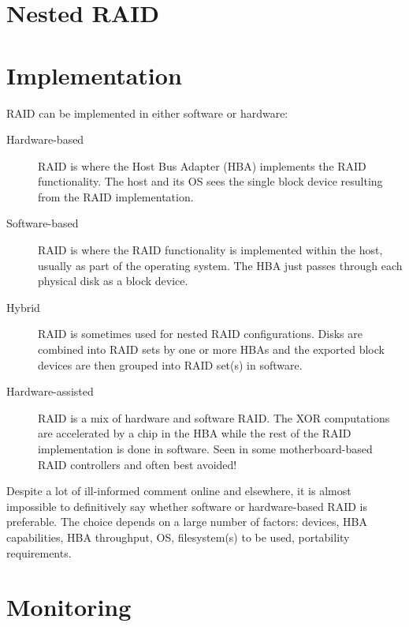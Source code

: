 \documentclass[slides]{pgnotes}
\begin{document}
\section{Nested RAID}
\label{sec:nested-raid}

\begin{minipage}{0.4\linewidth}
\end{minipage}
\hfill
\begin{minipage}{0.4\linewidth}
\end{minipage}

\section{Implementation}
\label{sec:implementation}

RAID can be implemented in either software or hardware:

\begin{description}
\item[Hardware-based]
RAID is where the Host Bus Adapter (HBA) implements the RAID
functionality. The host and its OS sees the single block device
resulting from the RAID implementation.
\item[Software-based]
RAID is where the RAID functionality is implemented within the host,
usually as part of the operating system. The HBA just passes through
each physical disk as a block device.
\item[Hybrid]
RAID is sometimes used for nested RAID configurations. Disks are
combined into RAID sets by one or more HBAs and the exported block
devices are then grouped into RAID set(s) in software.
\item[Hardware-assisted]
RAID is a mix of hardware and software RAID. The XOR computations are
accelerated by a chip in the HBA while the rest of the RAID
implementation is done in software. Seen in some motherboard-based RAID
controllers and often best avoided!
\end{description}

Despite a lot of ill-informed comment online and elsewhere, it is almost
impossible to definitively say whether software or hardware-based RAID
is preferable. The choice depends on a large number of factors: devices,
HBA capabilities, HBA throughput, OS, filesystem(s) to be used,
portability requirements.

\section{Monitoring}
\label{sec:monitoring}
\end{document}
